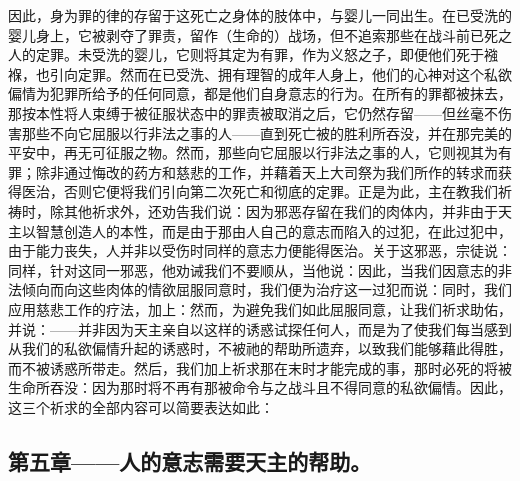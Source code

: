 因此，身为罪的律的存留于这死亡之身体的肢体中，与婴儿一同出生。在已受洗的婴儿身上，它被剥夺了罪责，留作（生命的）战场，但不追索那些在战斗前已死之人的定罪。未受洗的婴儿，它则将其定为有罪，作为义怒之子，即便他们死于襁褓，也引向定罪。然而在已受洗、拥有理智的成年人身上，他们的心神对这个私欲偏情为犯罪所给予的任何同意，都是他们自身意志的行为。在所有的罪都被抹去，那按本性将人束缚于被征服状态中的罪责被取消之后，它仍然存留——但丝毫不伤害那些不向它屈服以行非法之事的人——直到死亡被的胜利所吞没，并在那完美的平安中，再无可征服之物。然而，那些向它屈服以行非法之事的人，它则视其为有罪；除非通过悔改的药方和慈悲的工作，并藉着天上大司祭为我们所作的转求而获得医治，否则它便将我们引向第二次死亡和彻底的定罪。正是为此，主在教我们祈祷时，除其他祈求外，还劝告我们说：因为邪恶存留在我们的肉体内，并非由于天主以智慧创造人的本性，而是由于那由人自己的意志而陷入的过犯，在此过犯中，由于能力丧失，人并非以受伤时同样的意志力便能得医治。关于这邪恶，宗徒说：同样，针对这同一邪恶，他劝诫我们不要顺从，当他说：因此，当我们因意志的非法倾向而向这些肉体的情欲屈服同意时，我们便为治疗这一过犯而说：同时，我们应用慈悲工作的疗法，加上：然而，为避免我们如此屈服同意，让我们祈求助佑，并说：——并非因为天主亲自以这样的诱惑试探任何人，而是为了使我们每当感到从我们的私欲偏情升起的诱惑时，不被祂的帮助所遗弃，以致我们能够藉此得胜，而不被诱惑所带走。然后，我们加上祈求那在末时才能完成的事，那时必死的将被生命所吞没：因为那时将不再有那被命令与之战斗且不得同意的私欲偏情。因此，这三个祈求的全部内容可以简要表达如此：\par


\subsection{第五章——人的意志需要天主的帮助。}

